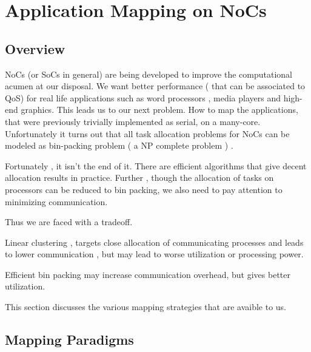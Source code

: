 
\lhead[\chaptername~\thechapter]{\rightmark}


\rhead[\leftmark]{}


\lfoot[\thepage]{}


\cfoot{}


\rfoot[]{\thepage}


\chapter{Application Mapping on NoCs}


\section{Overview}

NoCs (or SoCs in general) are being developed to improve the computational
acumen at our disposal. We want better performance ( that can be associated
to QoS) for real life applications such as word processors , media
players and high-end graphics. This leads us to our next problem.
How to map the applications, that were previously trivially implemented
as serial, on a many-core. Unfortunately it turns out that all task
allocation problems for NoCs can be modeled as bin-packing problem
( a NP complete problem ) . 

Fortunately , it isn't the end of it. There are efficient algorithms
that give decent allocation results in practice. Further , though
the allocation of tasks on processors can be reduced to bin packing,
we also need to pay attention to minimizing communication.

Thus we are faced with a tradeoff.

Linear clustering , targets close allocation of communicating processes
and leads to lower communication , but may lead to worse utilization
or processing power.

Efficient bin packing may increase communication overhead, but gives
better utilization.

This section discusses the various mapping strategies that are avaible
to us.

\pagebreak


\section{Mapping Paradigms}

